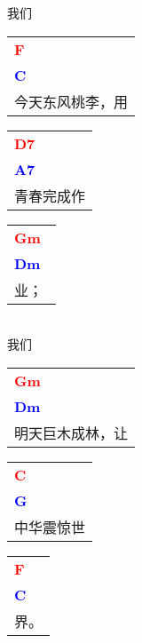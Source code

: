 \documentclass[12pt,a4paper,openany,UTF8]{memoir}
\begin{document}
我们\begin{tabular}[b]{l}
    \textbf{\textcolor{red}{F\ }}\\\textbf{\textcolor{blue}{C\ }}\\
    今天东风桃李，用\mbox{}\end{tabular}\begin{tabular}[b]{l}
    \textbf{\textcolor{red}{D7\ }}\\\textbf{\textcolor{blue}{A7\ }}\\
    青春完成作\mbox{}\end{tabular}\begin{tabular}[b]{l}
    \textbf{\textcolor{red}{Gm\ }}\\\textbf{\textcolor{blue}{Dm\ }}\\
    业；\mbox{}\end{tabular}\\
我们\begin{tabular}[b]{l}
    \textbf{\textcolor{red}{Gm\ }}\\\textbf{\textcolor{blue}{Dm\ }}\\
    明天巨木成林，让\mbox{}\end{tabular}\begin{tabular}[b]{l}
    \textbf{\textcolor{red}{C\ }}\\\textbf{\textcolor{blue}{G\ }}\\
    中华震惊世\mbox{}\end{tabular}\begin{tabular}[b]{l}
    \textbf{\textcolor{red}{F\ }}\\\textbf{\textcolor{blue}{C\ }}\\
    界。\mbox{}\end{tabular}

    \vspace{\parskip}
\end{document}
